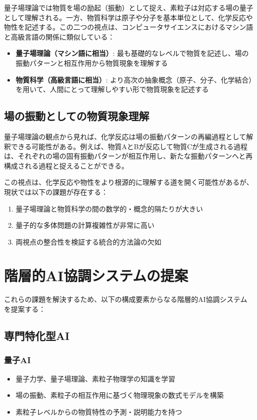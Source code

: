 \documentclass[12pt,a4paper]{article}
\begin{document}
量子場理論では物質を場の励起（振動）として捉え、素粒子は対応する場の量子として理解される。一方、物質科学は原子や分子を基本単位として、化学反応や物性を記述する。この二つの視点は、コンピュータサイエンスにおけるマシン語と高級言語の関係に類似している：

\begin{itemize}
\item \textbf{量子場理論（マシン語に相当）}: 最も基礎的なレベルで物質を記述し、場の振動パターンと相互作用から物質現象を理解する
\item \textbf{物質科学（高級言語に相当）}: より高次の抽象概念（原子、分子、化学結合）を用いて、人間にとって理解しやすい形で物質現象を記述する
\end{itemize}

\subsection{場の振動としての物質現象理解}

量子場理論の観点から見れば、化学反応は場の振動パターンの再編過程として解釈できる可能性がある。例えば、物質AとBが反応して物質Cが生成される過程は、それぞれの場の固有振動パターンが相互作用し、新たな振動パターンへと再構成される過程と捉えることができる。

この視点は、化学反応や物性をより根源的に理解する道を開く可能性があるが、現状では以下の課題が存在する：

\begin{enumerate}
\item 量子場理論と物質科学の間の数学的・概念的隔たりが大きい
\item 量子的な多体問題の計算複雑性が非常に高い
\item 両視点の整合性を検証する統合的方法論の欠如
\end{enumerate}

\section{階層的AI協調システムの提案}

これらの課題を解決するため、以下の構成要素からなる階層的AI協調システムを提案する：

\subsection{専門特化型AI}

\subsubsection{量子AI}
\begin{itemize}
\item 量子力学、量子場理論、素粒子物理学の知識を学習
\item 場の振動、素粒子の相互作用に基づく物理現象の数式モデルを構築
\item 素粒子レベルからの物質特性の予測・説明能力を持つ
\end{itemize}
\end{document}
